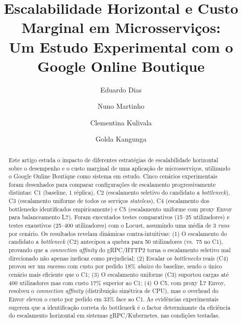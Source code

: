 \documentclass[manuscript,oneside]{acmart}
\begin{document}
\title[Escalabilidade e Custo Marginal em Microsserviços]{Escalabilidade Horizontal e Custo Marginal em Microsserviços:\\
Um Estudo Experimental com o Google Online Boutique}

\author{Eduardo Dias}

\author{Nuno Martinho}

\author{Clementina Kulivala}

\author{Golda Kangunga}

\renewcommand{\shortauthors}{Dias et al.}

\begin{abstract}
Este artigo estuda o impacto de diferentes estratégias de escalabilidade horizontal sobre o desempenho e o custo marginal de uma aplicação de microsserviços, utilizando o Google Online Boutique como sistema em estudo. Cinco cenários experimentais foram desenhados para comparar configurações de escalamento progressivamente distintas: C1 (baseline, 1 réplica), C2 (escalamento seletivo do candidato a \textit{bottleneck}), C3 (escalamento uniforme de todos os serviços \textit{stateless}), C4 (escalamento dos bottlenecks identificados empiricamente) e C5 (escalamento uniforme com proxy Envoy para balanceamento L7). Foram executados testes comparativos (15--25 utilizadores) e testes exaustivos (25--400 utilizadores) com o Locust, assumindo uma média de 3 \textit{runs} por cenário. Os resultados revelam dinâmicas contra-intuitivas: (1) O escalamento do candidato a \textit{bottleneck} (C2) antecipou a quebra para 50 utilizadores (vs.\ 75 no C1), provando que a \textit{connection affinity} do gRPC/HTTP2 torna o escalamento seletivo mal direcionado não apenas ineficaz como prejudicial; (2) Escalar os \textit{bottlenecks} reais (C4) provou ser um sucesso com custo por pedido 18\% \emph{abaixo} do baseline, sendo o único cenário mais eficiente que o C1; (3) O escalamento uniforme (C3) suportou cargas até 400 utilizadores mas com custo 17\% superior ao C1; (4) O C5, com proxy L7 Envoy, resolveu o \textit{connection affinity} (distribuição simétrica de CPU), mas o overhead do Envoy elevou o custo por pedido em 33\% face ao C1. As evidências experimentais sugerem que a identificação correta do bottleneck é o factor determinante da eficiência do escalamento horizontal em sistemas gRPC/Kubernetes, nas condições testadas.
\end{abstract}
\end{document}
